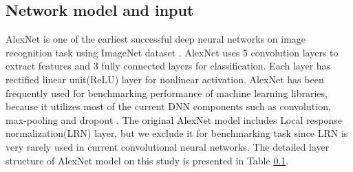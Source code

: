 \documentclass[conference]{IEEEtran}
\begin{document}
\subsection{Network model and input}
AlexNet \cite{} is one of the earliest successful deep neural networks on image recognition task using ImageNet dataset \cite{}.
AlexNet uses 5 convolution layers to extract features and 3 fully connected layers for classification.
Each layer has rectified linear unit(ReLU) layer for nonlinear activation.
AlexNet has been frequently used for benchmarking performance of machine learning libraries, because it utilizes most of the current DNN components such as convolution, max-pooling and dropout \cite{}.
The original AlexNet model includes Local response normalization(LRN) layer, but we exclude it for benchmarking task since LRN is very rarely used in current convolutional neural networks.
The detailed layer structure of AlexNet model on this study is presented in Table \ref{}.
\end{document}
